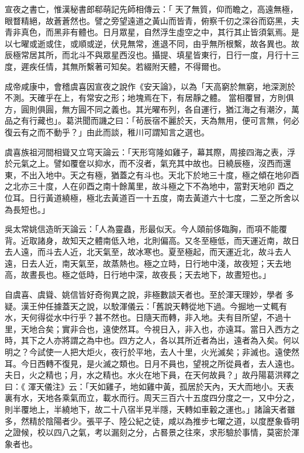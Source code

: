 \begin{pinyinscope}
{{ 宣夜之書亡，惟漢秘書郎郗萌記先師相傳云：「
 天了無質，仰而瞻之，高遠無極，眼瞀精絕，故蒼蒼然也。譬之旁望遠道之黃山而皆青，俯察千仞之深谷而窈黑，夫青非真色，而黑非有體也。日月眾星，自然浮生虛空之中，其行其止皆須氣焉。是以七曜或逝或住，或順或逆，伏見無常，進退不同，由乎無所根繫，故各異也。故辰極常居其所，而北斗不與眾星西沒也。攝提、填星皆東行，日行一度，月行十三度，遲疾任情，其無所繫著可知矣。若綴附天體，不得爾也。



 成帝咸康中，會稽虞喜因宣夜之說作《安天論》，以為「天高窮於無窮，地深測於不測。天確乎在上，有常安之形；地塊焉在下，有居靜之體。
 當相覆冒，方則俱方，圓則俱圓，無方圓不同之義也。其光曜布列，各自運行，猶江海之有潮汐，萬品之有行藏也」。葛洪聞而譏之曰：「茍辰宿不麗於天，天為無用，便可言無，何必復云有之而不動乎？」由此而談，稚川可謂知言之選也。



 虞喜族祖河間相聳又立穹天論云：「天形穹隆如雞子，幕其際，周接四海之表，浮於元氣之上。譬如覆奩以抑水，而不沒者，氣充其中故也。日繞辰極，沒西而還東，不出入地中。天之有極，猶蓋之有斗也。天北下於地三十度，極之傾在地卯酉之北亦三十度，人在卯酉之南十餘萬里，故斗極之下不為地中，當對天地卯
 酉之位耳。日行黃道繞極，極北去黃道百一十五度，南去黃道六十七度，二至之所舍以為長短也。」



 吳太常姚信造昕天論云：「人為靈蟲，形最似天。今人頤前侈臨胸，而項不能覆背。近取諸身，故知天之體南低入地，北則偏高。又冬至極低，而天運近南，故日去人遠，而斗去人近，北天氣至，故冰寒也。夏至極起，而天運近北，故斗去人遠，日去人近，南天氣至，故蒸熱也。極之立時，日行地中淺，故夜短；天去地高，故晝長也。極之低時，日行地中深，故夜長；天去地下，故晝短也。」



 自虞喜、虞聳、姚信皆好奇徇異之說，非極數談天者也。至於渾天理妙，學者
 多疑。漢王仲任據蓋天之說，以駮渾儀云：「舊說天轉從地下過。今掘地一丈輒有水，天何得從水中行乎？甚不然也。日隨天而轉，非入地。夫有目所望，不過十里，天地合矣；實非合也，遠使然耳。今視日入，非入也，亦遠耳。當日入西方之時，其下之人亦將謂之為中也。四方之人，各以其所近者為出，遠者為入矣。何以明之？今試使一人把大炬火，夜行於平地，去人十里，火光滅矣；非滅也。遠使然耳。今日西轉不復見，是火滅之類也。日月不員也，望視之所從員者，去人遠也。夫日，火之精也；月，水之精也。水火在地下員，在天何故員？」故丹陽葛洪釋之曰：《
 渾天儀注》云：「天如雞子，地如雞中黃，孤居於天內，天大而地小。天表裏有水，天地各乘氣而立，載水而行。周天三百六十五度四分度之一，又中分之，則半覆地上，半繞地下，故二十八宿半見半隱，天轉如車轂之運也。」諸論天者雖多，然精於陰陽者少。張平子、陸公紀之徒，咸以為推步七曜之道，以度歷象昏明之證候，校以四八之氣，考以漏刻之分，占晷景之往來，求形驗於事情，莫密於渾象者也。



}}
\end{pinyinscope}
